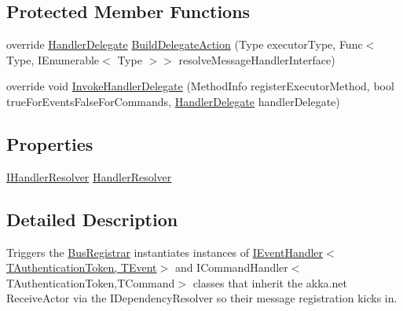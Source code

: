 \subsection*{Protected Member Functions}
\begin{DoxyCompactItemize}
\item 
override \hyperlink{classCqrs_1_1Configuration_1_1HandlerDelegate}{Handler\+Delegate} \hyperlink{classCqrs_1_1Akka_1_1Configuration_1_1AkkaBusRegistrar_ad7e3e5d332d5b4d781375a28f23bdb19_ad7e3e5d332d5b4d781375a28f23bdb19}{Build\+Delegate\+Action} (Type executor\+Type, Func$<$ Type, I\+Enumerable$<$ Type $>$$>$ resolve\+Message\+Handler\+Interface)
\item 
override void \hyperlink{classCqrs_1_1Akka_1_1Configuration_1_1AkkaBusRegistrar_a0ac474751b2ba8ebb27b885a15fbf053_a0ac474751b2ba8ebb27b885a15fbf053}{Invoke\+Handler\+Delegate} (Method\+Info register\+Executor\+Method, bool true\+For\+Events\+False\+For\+Commands, \hyperlink{classCqrs_1_1Configuration_1_1HandlerDelegate}{Handler\+Delegate} handler\+Delegate)
\end{DoxyCompactItemize}
\subsection*{Properties}
\begin{DoxyCompactItemize}
\item 
\hyperlink{interfaceCqrs_1_1Akka_1_1Configuration_1_1IHandlerResolver}{I\+Handler\+Resolver} \hyperlink{classCqrs_1_1Akka_1_1Configuration_1_1AkkaBusRegistrar_a642cd7215c2f51cfaff263f9ba95a4c4_a642cd7215c2f51cfaff263f9ba95a4c4}{Handler\+Resolver}
\end{DoxyCompactItemize}


\subsection{Detailed Description}
Triggers the \hyperlink{classCqrs_1_1Configuration_1_1BusRegistrar_a4a934d21a535b28af6c67154512bba20_a4a934d21a535b28af6c67154512bba20}{Bus\+Registrar} instantiates instances of \hyperlink{interfaceCqrs_1_1Events_1_1IEventHandler}{I\+Event\+Handler$<$\+T\+Authentication\+Token, T\+Event$>$} and I\+Command\+Handler$<$\+T\+Authentication\+Token,\+T\+Command$>$ classes that inherit the akka.\+net Receive\+Actor via the I\+Dependency\+Resolver so their message registration kicks in. 



